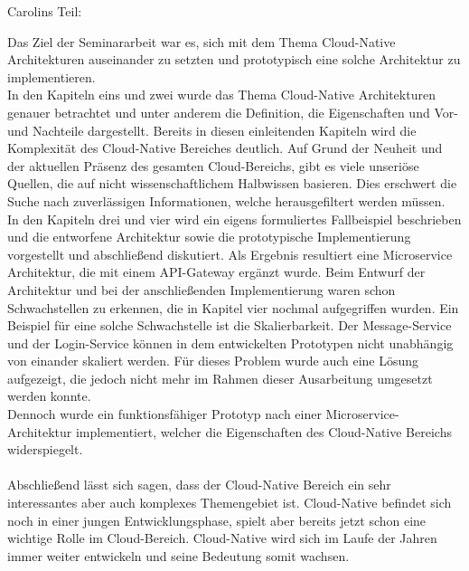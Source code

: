 Carolins Teil:

Das Ziel der Seminararbeit war es, sich mit dem Thema Cloud-Native Architekturen auseinander zu setzten und prototypisch eine solche Architektur zu implementieren.\\
In den Kapiteln eins und zwei wurde das Thema Cloud-Native Architekturen genauer betrachtet und unter anderem die Definition, die Eigenschaften und Vor-und Nachteile dargestellt. Bereits in diesen einleitenden Kapiteln wird die Komplexität des Cloud-Native Bereiches deutlich. Auf Grund der Neuheit und der aktuellen Präsenz des gesamten Cloud-Bereichs, gibt es viele unseriöse Quellen, die auf nicht wissenschaftlichem Halbwissen basieren. Dies erschwert die Suche nach zuverlässigen Informationen, welche herausgefiltert werden müssen.\\
In den Kapiteln drei und vier wird ein eigens formuliertes Fallbeispiel beschrieben und die entworfene Architektur sowie die prototypische Implementierung vorgestellt und abschließend diskutiert. Als Ergebnis resultiert eine Microservice Architektur, die mit einem API-Gateway ergänzt wurde. Beim Entwurf der Architektur und bei der anschließenden Implementierung waren schon Schwachstellen zu erkennen, die in Kapitel vier nochmal aufgegriffen wurden. Ein Beispiel für eine solche Schwachstelle ist die Skalierbarkeit. Der Message-Service und der Login-Service können in dem entwickelten Prototypen nicht unabhängig von einander skaliert werden. Für dieses Problem wurde auch eine Lösung aufgezeigt, die jedoch nicht mehr im Rahmen dieser Ausarbeitung umgesetzt werden konnte.\\
Dennoch wurde ein funktionsfähiger Prototyp nach einer Microservice-Architektur implementiert, welcher die Eigenschaften des Cloud-Native Bereichs widerspiegelt.\\
\\
Abschließend lässt sich sagen, dass der Cloud-Native Bereich ein sehr interessantes aber auch komplexes Themengebiet ist. Cloud-Native befindet sich noch in einer jungen Entwicklungsphase, spielt aber bereits jetzt schon eine wichtige Rolle im Cloud-Bereich. Cloud-Native wird sich im Laufe der Jahren immer weiter entwickeln und seine Bedeutung somit wachsen. 
